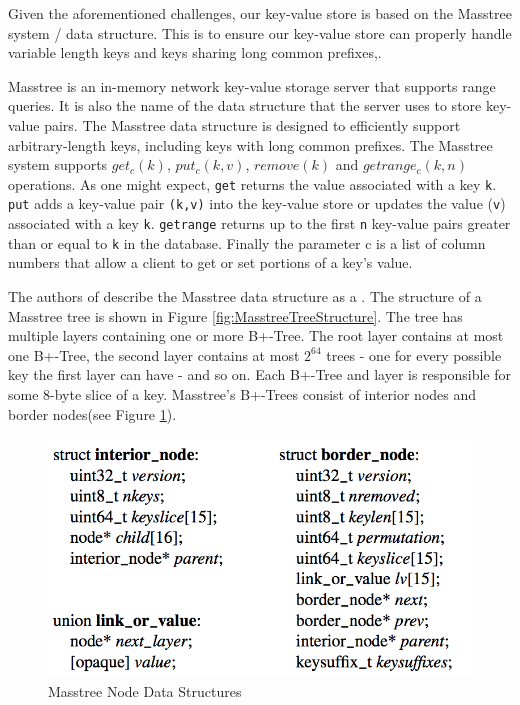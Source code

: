 Given the aforementioned challenges, our key-value store is based on the Masstree system / data structure. This is to ensure our key-value store can properly handle variable length keys and keys sharing long common prefixes,. 

Masstree \cite{masstree} is an in-memory network key-value storage server that supports range queries. It is also the name of the data structure that the server uses to store key-value pairs. The Masstree data structure is designed to efficiently support arbitrary-length keys, including keys with long common prefixes.  The Masstree system supports \texttt{$get_c(k)$}, \texttt{$put_c(k,v)$}, \texttt{$remove(k)$} and \texttt{$getrange_c(k,n)$} operations. As one might expect, \texttt{get} returns the value associated with a key \texttt{k}. \texttt{put} adds a key-value pair \texttt{(k,v)} into the key-value store or updates the value (\texttt{v}) associated with a key \texttt{k}. \texttt{getrange} returns up to the first \texttt{n} key-value pairs greater than or equal to \texttt{k} in the database. Finally the parameter c is a list of column numbers that allow a client to get or set portions of a key's value. 

The authors of \cite{masstree} describe the Masstree data structure as a . The structure of a Masstree tree is shown in Figure \ref{fig:MasstreeTreeStructure}. The tree has multiple layers containing one or more B+-Tree. The root layer contains at most one B+-Tree, the second layer contains at most $2^{64}$ trees - one for every possible key the first layer can have - and so on. Each B+-Tree and layer is responsible for some 8-byte slice of a key. Masstree's B+-Trees consist of interior nodes and border nodes(see Figure \ref{fig:MasstreenodeDS}). 

\begin{figure}[htbp]
    \centering
    \includegraphics[scale=0.50]{figures/masstreenodestructures.png}
    \caption{Masstree Node Data Structures \cite{masstree}}
    \label{fig:MasstreenodeDS}
\end{figure}

